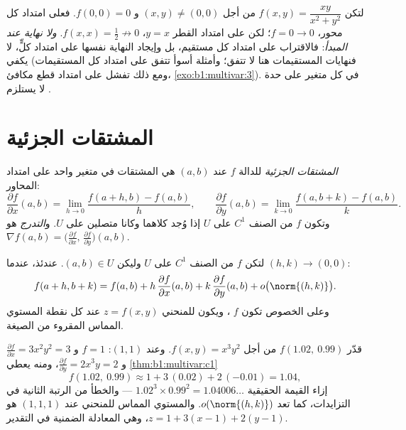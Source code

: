 \begin{example}\label{ex:b1:multivar:trap}
لتكن $f(x, y) = \dfrac{xy}{x^2 + y^2}$ من أجل $(x,y) \neq (0,0)$ و $f(0,
0) = 0$. فعلى امتداد كل محور، $f = 0 \to 0$؛ لكن على امتداد القطر $y
= x$، $f(x, x) = \frac12 \not\to 0$. \emph{ولا نهاية عند المبدأ}:
فالاقتراب على امتداد كل مستقيم، بل وإيجاد النهاية نفسها على امتداد
كلٍّ، لا يكفي (فنهايات المستقيمات هنا لا تتفق؛ وأمثلة أسوأ
تتفق على امتداد كل المستقيمات ومع ذلك تفشل على امتداد قطع مكافئ،
\cref{exo:b1:multivar:3}).  في كل متغير على حدة
لا يستلزم .
\end{example}

\section{المشتقات الجزئية}

\begin{definition}\label{def:b1:multivar:partial}
\emph{المشتقات الجزئية} للدالة $f$ عند
$(a, b)$ هي المشتقات في متغير واحد على امتداد المحاور:
\[
\frac{\partial f}{\partial x}(a,b)
= \lim_{h \to 0} \frac{f(a + h, b) - f(a,b)}{h},
\qquad
\frac{\partial f}{\partial y}(a,b)
= \lim_{k \to 0} \frac{f(a, b + k) - f(a,b)}{k}.
\]
وتكون $f$ من الصنف $C^1$ على $U$ إذا وُجد كلاهما وكانا متصلين على
$U$. و\emph{التدرج} هو $\nabla f(a,b) =
\bigl(\frac{\partial f}{\partial x},\, \frac{\partial f}{\partial
y}\bigr)(a,b)$.
\end{definition}

\begin{theorem}\label{thm:b1:multivar:c1}
لتكن $f$ من الصنف $C^1$ على $U$ وليكن $(a,b) \in U$. عندئذ، عندما $(h, k) \to
(0,0)$:
\[
f(a + h, b + k) = f(a, b)
+ h\,\frac{\partial f}{\partial x}(a,b)
+ k\,\frac{\partial f}{\partial y}(a,b)
+ o\bigl(\norm{(h,k)}\bigr) .
\]
وعلى الخصوص تكون $f$ ، ويكون للمنحني $z = f(x,y)$ عند
كل نقطة المستوي المماس المقروء من الصيغة.
\end{theorem}

\begin{example}
\label{ex:b1:multivar:linapprox}
قدّر $f(1.02,\ 0.99)$ من أجل $f(x, y) = x^3y^2$. وعند $(1, 1)$:
$f = 1$ و $\frac{\partial f}{\partial x} = 3x^2y^2 = 3$ و
$\frac{\partial f}{\partial y} = 2x^3y = 2$، ومنه يعطي
\cref{thm:b1:multivar:c1}
\[
f(1.02,\ 0.99) \approx 1 + 3\,(0.02) + 2\,(-0.01) = 1.04 ,
\]
إزاء القيمة الحقيقية $1.02^3 \times 0.99^2 = 1.04006\dots$ ---
والخطأ من الرتبة الثانية في التزايدات، كما تعد
$o(\norm{(h,k)})$. والمستوي المماس للمنحني عند
$(1, 1, 1)$ هو $z = 1 + 3(x - 1) + 2(y - 1)$، وهي المعادلة
الضمنية في التقدير.
\end{example}

